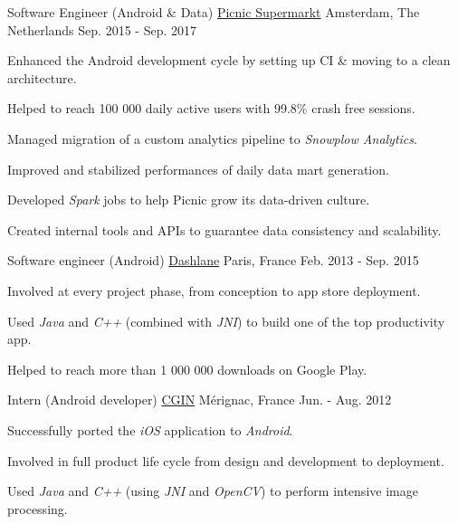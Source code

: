 
	\begin{cventries}
	
		\cventry
			{Software Engineer (Android \& Data)}
			{\href{https://www.picnic.nl}{Picnic Supermarkt}}
			{Amsterdam, The Netherlands}
			{Sep. 2015 - Sep. 2017}
			{
				\begin{cvitems}
					\item Enhanced the Android development cycle by setting up CI \& moving to a clean architecture.
					\item Helped to reach 100 000 daily active users with 99.8\% crash free sessions.
					\item Managed migration of a custom analytics pipeline to \textit{Snowplow Analytics}.
					\item Improved and stabilized performances of daily data mart generation.
					\item Developed \textit{Spark} jobs to help Picnic grow its data-driven culture.
					\item Created internal tools and APIs to guarantee data consistency and scalability.
				\end{cvitems}
			}
		
		\cventry
			{Software engineer (Android)}
			{\href{https://www.dashlane.com}{Dashlane}}
			{Paris, France}
			{Feb. 2013 - Sep. 2015}
			{
				\begin{cvitems}
					\item Involved at every project phase, from conception to app store deployment.
					\item Used \textit{Java} and \textit{C++} (combined with \textit{JNI}) to build one of the top productivity app.
					\item Helped to reach more than 1 000 000 downloads on Google Play.
				\end{cvitems}
			}
		
		\cventry
			{Intern (Android developer)}
			{\href{https://www.photoservice.com}{CGIN}}
			{Mérignac, France}
			{Jun. - Aug. 2012}
			{
				\begin{cvitems}
					\item Successfully ported the \textit{iOS} application to \textit{Android}.
					\item Involved in full product life cycle from design and development to deployment.
					\item Used \textit{Java} and \textit{C++} (using \textit{JNI} and \textit{OpenCV}) to perform intensive image processing.
				\end{cvitems}
			}
		

\end{cventries}
